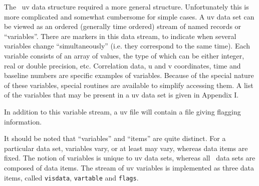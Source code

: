 The \miriad\ uv data structure required a more general structure. Unfortunately
this is more complicated and somewhat cumbersome for simple cases.
A uv data set can be viewed as an ordered (generally time ordered) stream of
named records or ``variables''. There are markers in this data stream, to
indicate when
several variables change ``simultaneously'' (i.e. they correspond to the
same time). Each variable
consists of an array of values, the type of which can be either integer, real
or double precision, etc. Correlation data, u and v coordinates,
time and baseline numbers are specific examples of variables.
Because of the special nature of these variables, special routines are
available to simplify accessing them. A list of the variables
that may be present in a uv data set is given in Appendix I.

In addition to this variable stream, a uv file will contain a file giving
flagging information.

It should be noted that ``variables'' and ``items''
are quite distinct. For a particular data set, variables vary, or at least may
vary,
whereas data items are fixed. The notion of variables is unique to uv data sets,
whereas all \miriad\ data sets are composed of data items. The stream of
uv variables is implemented as three data items, called {\tt visdata},
{\tt vartable} and {\tt flags}.

